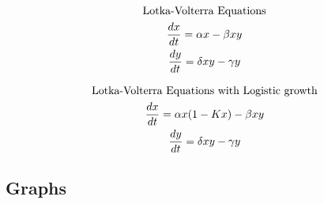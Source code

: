 \documentclass[11pt,a4paper]{CLabBookTemplate} %
\begin{document}
\begin{gather}
	\textrm{Lotka-Volterra Equations} \notag \\
	\label{Eq:LVE1}
	\frac{dx}{dt} = \alpha x - \beta xy \\
	\label{Eq:LVE2}
	\frac{dy}{dt} = \delta xy - \gamma y
\end{gather}

\begin{gather}
\textrm{Lotka-Volterra Equations with Logistic growth} \notag \\
\label{Eq:LVE1Log}
\frac{dx}{dt} = \alpha x(1 - Kx) - \beta xy \\
\label{Eq:LVE2Log}
\frac{dy}{dt} = \delta xy - \gamma y
\end{gather}

\newpage
\subsection{Graphs}
\end{document}
